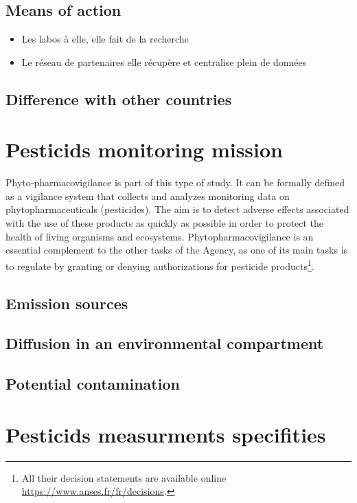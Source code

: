 \subsection{Means of action}

\begin{itemize}
\item Les labos à elle, elle fait de la recherche
\item Le réseau de partenaires elle récupère et centralise plein de données
\end{itemize}

\subsection{Difference with other countries}



\section{Pesticids monitoring mission}\label{chp:2:2}

Phyto-pharmacovigilance is part of this type of study. It can be formally defined as a vigilance system that collects and analyzes monitoring data on phytopharmaceuticals (pesticides). The aim is to detect adverse effects associated with the use of these products as quickly as possible in order to protect the health of living organisms and ecosystems. Phytopharmacovigilance is an essential complement to the other tasks of the Agency, as one of its main tasks is to regulate by granting or denying authorizations for pesticide products\footnote{All their decision statements are available online \url{https://www.anses.fr/fr/decisions}.}.

\subsection{Emission sources}

\subsection{Diffusion in an environmental compartment}

\subsection{Potential contamination}

 

\section{Pesticids measurments specifities}\label{chp:2:3}

